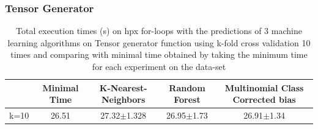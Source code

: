 \subsubsection{Tensor Generator}
\begin{table}[h]
	\centering
	\caption{Total execution times (s) on hpx for-loops with the predictions of 3 machine learning algorithms on Tensor generator function using k-fold cross validation 10 times and comparing with minimal time obtained by taking the minimum time for each experiment on the data-set}
	\label{my-label}
	\begin{tabular}{|c|c|c|c|c|}
		\hline
		& Minimal Time&K-Nearest-Neighbors & Random Forest &Multinomial Class Corrected bias\\ \hline
		k=10  &26.51&
		27.32$\pm$1.328      & 26.95$\pm$1.73&26.91$\pm$1.34 \\ \hline
	\end{tabular}
\end{table}

